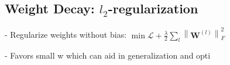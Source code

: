 

















\subsection*{Weight Decay: $l_{2}$-regularization}

- Regularize weights without bias:
$
\min \mathscr{L}+\frac{\lambda}{2} \sum_{l}\left\|\mathbf{W}^{(l)}\right\|_{F}^{2}
$

- Favors small w which can aid in generalization and opti

